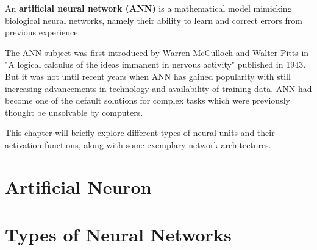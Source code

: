 An \textbf{artificial neural network (ANN)} is a mathematical model mimicking biological neural networks,
namely their ability to learn and correct errors from previous experience.\cite{designimplentationcc}\cite{bengio2017deep} 

The ANN subject was first introduced by Warren McCulloch and Walter Pitts in "A logical calculus of the ideas immanent in nervous activity" published in 1943.\cite{mcculloch1943logical} But it was not until recent years when ANN has gained popularity with still increasing advancements in technology and availability of training data. ANN had become one of the default solutions for complex tasks which were previously thought be unsolvable by computers.\cite{neural2016krishtopa}

This chapter will briefly explore different types of neural units and their activation functions, along with some exemplary network architectures.

\section{Artificial Neuron}

\section{Types of Neural Networks}

